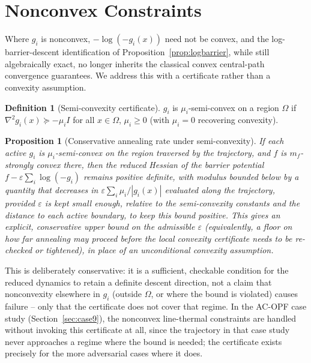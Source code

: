 \documentclass[11pt,onecolumn]{article}
\newtheorem{proposition}[theorem]{Proposition}
\theoremstyle{definition}
\newtheorem{definition}[theorem]{Definition}
\theoremstyle{remark}
\begin{document}
\section{Nonconvex Constraints} \label{sec:nonconvex}

Where $g_i$ is nonconvex, $-\log(-g_i(x))$ need not be convex, and the log-barrier-descent
identification of Proposition~\ref{prop:logbarrier}, while still algebraically exact, no longer
inherits the classical convex central-path convergence guarantees. We address this with a
certificate rather than a convexity assumption.

\begin{definition}[Semi-convexity certificate]
$g_i$ is $\mu_i$-semi-convex on a region $\Omega$ if $\nabla^2 g_i(x) \succeq -\mu_i I$ for all
$x \in \Omega$, $\mu_i \ge 0$ (with $\mu_i = 0$ recovering convexity).
\end{definition}

\begin{proposition}[Conservative annealing rate under semi-convexity]
If each active $g_i$ is $\mu_i$-semi-convex on the region traversed by the trajectory, and $f$
is $m_f$-strongly convex there, then the reduced Hessian of the barrier potential
$f - \varepsilon \sum_i \log(-g_i)$ remains positive definite, with modulus bounded below by a
quantity that decreases in $\varepsilon \sum_i \mu_i/|g_i(x)|$ evaluated along the trajectory,
provided $\varepsilon$ is kept small enough, relative to the semi-convexity constants and the
distance to each active boundary, to keep this bound positive. This gives an explicit,
conservative upper bound on the admissible $\varepsilon$ (equivalently, a floor on how far
annealing may proceed before the local convexity certificate needs to be re-checked or
tightened), in place of an unconditional convexity assumption.
\end{proposition}

This is deliberately conservative: it is a sufficient, checkable condition for the reduced
dynamics to retain a definite descent direction, not a claim that nonconvexity elsewhere in
$g_i$ (outside $\Omega$, or where the bound is violated) causes failure -- only that the
certificate does not cover that regime. In the AC-OPF case study (Section~\ref{sec:case9}), the
nonconvex line-thermal constraints are handled without invoking this certificate at all, since
the trajectory in that case study never approaches a regime where the bound is needed; the
certificate exists precisely for the more adversarial cases where it does.
\end{document}
